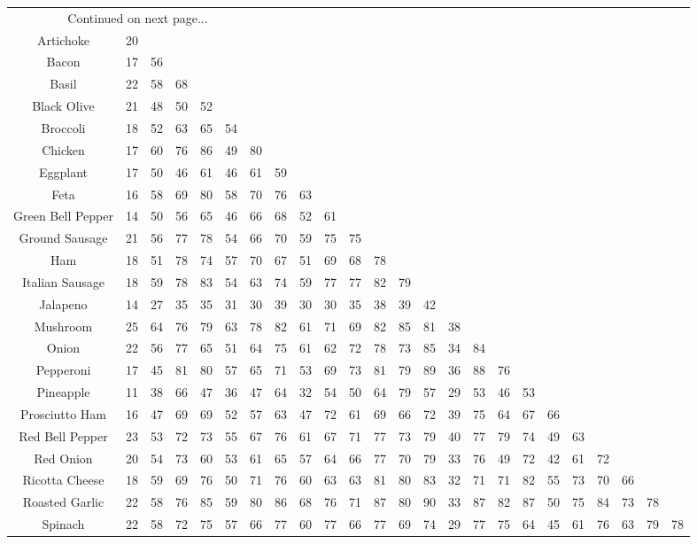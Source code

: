 \begin{landscape}
\begin{longtable}{cccccccccccccccccccccccc}
\endhead
\midrule
 \multicolumn{7}{c}{Continued on next page...} \\
\endfoot
\bottomrule
\endlastfoot
Artichoke&20&&&&&&&&&&&&&&&&&&&&&& \\
Bacon&17&56&&&&&&&&&&&&&&&&&&&&& \\
Basil&22&58&68&&&&&&&&&&&&&&&&&&&& \\
Black Olive&21&48&50&52&&&&&&&&&&&&&&&&&&& \\
Broccoli&18&52&63&65&54&&&&&&&&&&&&&&&&&& \\
Chicken&17&60&76&86&49&80&&&&&&&&&&&&&&&&&\\
Eggplant&17&50&46&61&46&61&59&&&&&&&&&&&&&&&& \\
Feta&16&58&69&80&58&70&76&63&&&&&&&&&&&&&&& \\
Green Bell Pepper&14&50&56&65&46&66&68&52&61&&&&&&&&&&&&&& \\
Ground Sausage&21&56&77&78&54&66&70&59&75&75&&&&&&&&&&&&& \\
Ham&18&51&78&74&57&70&67&51&69&68&78&&&&&&&&&&&& \\
Italian Sausage&18&59&78&83&54&63&74&59&77&77&82&79&&&&&&&&&&& \\
Jalapeno&14&27&35&35&31&30&39&30&30&35&38&39&42&&&&&&&&&& \\
Mushroom&25&64&76&79&63&78&82&61&71&69&82&85&81&38&&&&&&&&& \\
Onion&22&56&77&65&51&64&75&61&62&72&78&73&85&34&84&&&&&&&& \\
Pepperoni&17&45&81&80&57&65&71&53&69&73&81&79&89&36&88&76&&&&&&& \\
Pineapple&11&38&66&47&36&47&64&32&54&50&64&79&57&29&53&46&53&&&&&& \\
Prosciutto Ham&16&47&69&69&52&57&63&47&72&61&69&66&72&39&75&64&67&66&&&&& \\
Red Bell Pepper&23&53&72&73&55&67&76&61&67&71&77&73&79&40&77&79&74&49&63&&&& \\
Red Onion&20&54&73&60&53&61&65&57&64&66&77&70&79&33&76&49&72&42&61&72&&& \\
Ricotta Cheese&18&59&69&76&50&71&76&60&63&63&81&80&83&32&71&71&82&55&73&70&66&& \\
Roasted Garlic&22&58&76&85&59&80&86&68&76&71&87&80&90&33&87&82&87&50&75&84&73&78& \\
Spinach&22&58&72&75&57&66&77&60&77&66&77&69&74&29&77&75&64&45&61&76&63&79&78 \\

\end{longtable}
\end{landscape}


